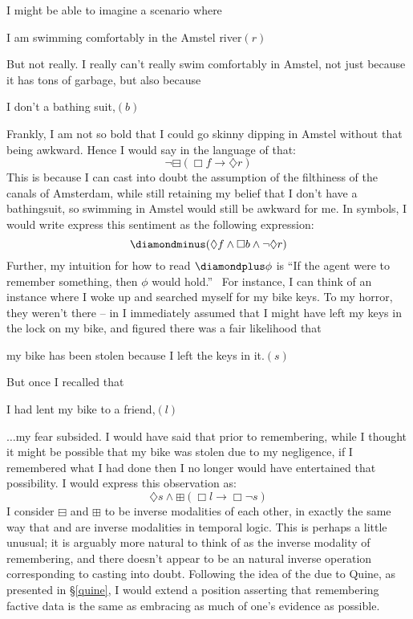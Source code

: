I might be able to imagine a scenario where

{\hspace*{\fill}}I am swimming comfortably in the Amstel
river{\hspace*{\fill}}$(r)$

But not really.  I really can't really swim comfortably in Amstel, not just
because it has tons of garbage, but also because

{\hspace*{\fill}}I don't a bathing suit,{\hspace*{\fill}}$(b)$

Frankly, I am not so bold that I could go skinny dipping in Amstel without
that being awkward.  Hence I would say in the language of 
that:
\[ \neg \boxminus (\Box  f \rightarrow \diamondsuit r) \]
This is because I can cast into doubt the assumption of the filthiness of the
canals of Amsterdam, while still retaining my belief that I don't have a
bathingsuit, so swimming in Amstel would still be awkward for me.  In
symbols, I would write express this sentiment as the following expression:
\[ \DM (\diamondsuit f \wedge \Box  b \wedge \neg \diamondsuit r)
\]
Further, my intuition for how to read $\DP \phi$ is ``If the
 agent were to remember something, then $\phi$ would hold.'' \
For instance, I can think of an instance where I woke up and searched myself
for my bike keys.  To my horror, they weren't there -- in I immediately
assumed that I might have left my keys in the lock on my bike, and figured
there was a fair likelihood that

{\hspace*{\fill}}my bike has been stolen because I left the keys in
it.{\hspace*{\fill}}$(s)$

But once I recalled that

{\hspace*{\fill}}I had lent my bike to a friend,{\hspace*{\fill}}$(l)$

$\ldots$my fear subsided.  I would have said that prior to remembering, while
I thought it might be possible that my bike was stolen due to my negligence,
if I remembered what I had done then I no longer would have entertained that
possibility.  I would express this observation as:
\[ \diamondsuit s \wedge \boxplus (\Box  l \rightarrow \Box  \neg s) \]
I consider $\boxminus$ and $\boxplus$ to be inverse modalities of each other,
in exactly the same way that \tmtextit{past} and \tmtextit{future} are inverse
modalities in temporal logic. This is perhaps a little unusual; it is arguably
more natural to think of \tmtextit{forgetting} as the inverse modality of
remembering, and there doesn't appear to be an natural inverse operation
corresponding to casting into doubt.  Following the idea of the \tmtextit{web
of belief} due to Quine, as presented in \S\ref{quine}, I would extend a position
asserting that remembering factive data is the same as embracing as much of
one's evidence as possible.

